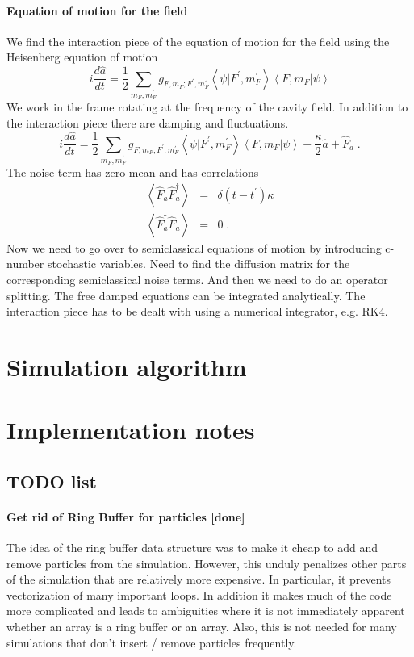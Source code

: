 \documentclass[aps, superscriptaddress, groupedaddress, preprint]{revtex4}
\begin{document}
\paragraph{Equation of motion for the field} We find the
interaction piece of the equation of motion for the field using
the Heisenberg equation of motion
\begin{equation}
i\frac{d\hat a}{dt}=
\frac{1}{2}\sum_{m_F,m_F^\prime}
g_{F, m_F;F^\prime, m_F^\prime}
\left<\psi|F^\prime, m_F^\prime\right>
\left<F, m_F|\psi\right>
\end{equation}
We work in the frame rotating at the frequency of the cavity
field.  In addition to the interaction piece there are damping
and fluctuations.
\begin{equation}
i\frac{d\hat a}{dt}=
\frac{1}{2}\sum_{m_F,m_F^\prime}
g_{F, m_F;F^\prime, m_F^\prime}
\left<\psi|F^\prime, m_F^\prime\right>
\left<F, m_F|\psi\right>
-\frac{\kappa}{2}\hat a + \hat F_a\;.
\end{equation}
The noise term has zero mean and has correlations
\begin{eqnarray}
\left<\hat F_a\hat F_a^\dagger\right>&=&\delta(t-t^\prime)\kappa\\
\left<\hat F_a^\dagger\hat F_a\right>&=&0\;.
\end{eqnarray}
Now we need to go over to semiclassical equations of motion by
introducing c-number stochastic variables.  Need to find the
diffusion matrix for the corresponding semiclassical noise terms.
And then we need to do an operator splitting.  The free damped
equations can be integrated analytically.  The interaction piece
has to be dealt with using a numerical integrator, e.g. RK4.



\section{Simulation algorithm}

\section{Implementation notes}

\subsection{TODO list}

\paragraph{Get rid of Ring Buffer for particles {\bf [done]}} The
idea of the ring buffer data structure was to make it cheap to
add and remove particles from the simulation.  However, this
unduly penalizes other parts of the simulation that are
relatively more expensive.  In particular, it prevents
vectorization of many important loops.  In addition it makes much
of the code more complicated and leads to ambiguities where it is
not immediately apparent whether an array is a ring buffer or an
array.  Also, this is not needed for many simulations that don't
insert / remove particles frequently.
\end{document}
